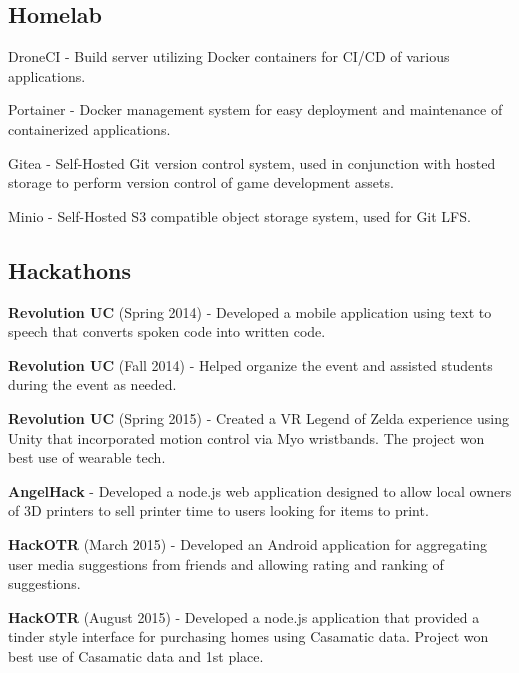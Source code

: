 \subsection{{Homelab \hfill}}
\begin{zitemize}
\item DroneCI - Build server utilizing Docker containers for CI/CD of various applications.
\item Portainer - Docker management system for easy deployment and maintenance of containerized applications.
\item Gitea - Self-Hosted Git version control system, used in conjunction with hosted storage to perform version control of game development assets.
\item Minio - Self-Hosted S3 compatible object storage system, used for Git LFS.
\end{zitemize}

\subsection{{Hackathons \hfill}}
\begin{zitemize}
\item \textbf{Revolution UC} (Spring 2014) - Developed a mobile application using text to speech that converts spoken code into written code.
\item \textbf{Revolution UC} (Fall 2014) - Helped organize the event and assisted students during the event as needed.
\item \textbf{Revolution UC} (Spring 2015) - Created a VR Legend of Zelda experience using Unity that incorporated motion control via Myo wristbands. The project won best use of wearable tech.
\item \textbf{AngelHack} - Developed a node.js web application designed to allow local owners of 3D printers to sell printer time to users looking for items to print.
\item \textbf{HackOTR} (March 2015) - Developed an Android application for aggregating user media suggestions from friends and allowing rating and ranking of suggestions.
\item \textbf{HackOTR} (August 2015) - Developed a node.js application that provided a tinder style interface for purchasing homes using Casamatic data. Project won best use of Casamatic data and 1st place.
\end{zitemize}


